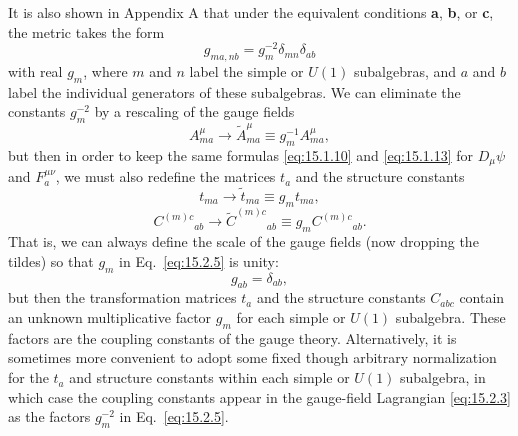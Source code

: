It is also shown in Appendix A that under the equivalent conditions \textbf{a},
\textbf{b}, or \textbf{c}, the metric takes the form
\begin{equation}
 g_{ma,nb}=g_m^{-2}\delta_{mn}\delta_{ab}
 \tag{15.2.5}\label{eq:15.2.5}
\end{equation}
with real $g_m$, where $m$ and $n$ label the simple or $U(1)$ subalgebras, and
$a$ and $b$ label the individual generators of these subalgebras. We can
eliminate the constants $g_m^{-2}$ by a rescaling of the gauge fields
\begin{equation}
 A^\mu_{ma}\longrightarrow\widetilde A^\mu_{ma}
 \equiv g_m^{-1}A^\mu_{ma} ,
 \tag{15.2.6}\label{eq:15.2.6}
\end{equation}
but then in order to keep the same formulas \eqref{eq:15.1.10} and
\eqref{eq:15.1.13} for $D_\mu\psi$ and $F_a^{\mu\nu}$, we must also
redefine the matrices $t_a$ and the structure constants
\begin{equation}
 t_{ma}\longrightarrow\widetilde t_{ma}\equiv g_m t_{ma} ,
 \tag{15.2.7}\label{eq:15.2.7}
\end{equation}
\begin{equation}
 C^{(m)c}{}_{ab}\longrightarrow\widetilde C^{(m)c}{}_{ab}
 \equiv g_m C^{(m)c}{}_{ab} .
 \tag{15.2.8}\label{eq:15.2.8}
\end{equation}
That is, we can always define the scale of the gauge fields (now dropping the
tildes) so that $g_m$ in Eq.~\eqref{eq:15.2.5} is unity:
\begin{equation}
 g_{ab}=\delta_{ab} ,
 \tag{15.2.9}\label{eq:15.2.9}
\end{equation}
but then the transformation matrices $t_a$ and the structure constants
$C_{abc}$ contain an unknown multiplicative factor $g_m$ for each
simple or $U(1)$ subalgebra. These factors are the coupling constants of the gauge
theory. Alternatively, it is sometimes more convenient to adopt some fixed though
arbitrary normalization for the $t_a$ and structure constants within each
simple or $U(1)$ subalgebra, in which case the coupling constants appear in the
gauge-field Lagrangian \eqref{eq:15.2.3} as the factors $g_m^{-2}$ in
Eq.~\eqref{eq:15.2.5}.
